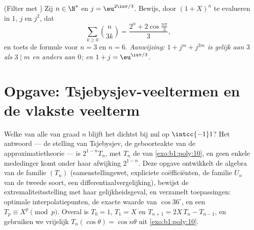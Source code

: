\begin{exercise}[$\star\star$]\label{exo:b1:poly:12}
(Filter met ) Zij $n \in \N^*$ en $j = \eu^{2\iu\pi/3}$.
Bewijs, door $(1 + X)^n$ te evalueren in $1$, $j$ en $j^2$, dat
\[
\sum_{k \geq 0} \binom{n}{3k}
= \frac{2^n + 2\cos\frac{n\pi}{3}}{3} ,
\]
en toets de formule voor $n = 3$ en $n = 6$. \emph{Aanwijzing: $1 + j^m +
j^{2m}$ is gelijk aan $3$ als $3 \mid m$ en anders aan $0$; en $1 + j =
\eu^{\iu\pi/3}$.}
\end{exercise}

\section{Opgave: Tsjebysjev-veeltermen en de vlakste veelterm}

\begin{problem}\label{pb:b1:poly:1}
Welke van alle \emph{}  van graad $n$ blijft het
dichtst bij nul op $\intcc{-1}1$? Het antwoord --- de stelling van
Tsjebysjev, de geboorteakte van de approximatietheorie --- is
$2^{1-n}T_n$, met $T_n$ de  van
\cref{exo:b1:poly:10}, en geen enkele  mededinger komt onder haar
afwijking $2^{1-n}$. Deze opgave ontwikkelt
de algebra van de familie $(T_n)$ (samenstellingswet, expliciete
coëfficiënten, de familie $U_n$ van de tweede soort, een
differentiaalvergelijking), bewijst de extremaliteitsstelling met haar
gelijkheidsgeval, en verzamelt toepassingen: optimale interpolatiepunten,
de exacte waarde van $\cos 36^\circ$, en een  $T_p \equiv X^p
\pmod p$. Overal is $T_0 = 1$, $T_1 = X$ en $T_{n+1} = 2X\,T_n -
T_{n-1}$, en gebruiken we vrijelijk $T_n(\cos\theta) = \cos n\theta$ uit
\cref{exo:b1:poly:10}.


\end{problem}
